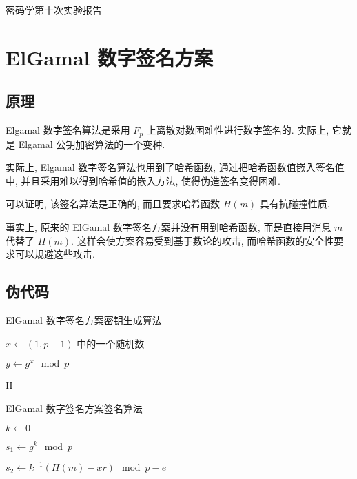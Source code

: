 \documentclass[12pt,a4paper]{article}
\begin{document}
{
\begin{center}
密码学第十次实验报告
\end{center}
}

\section*{ElGamal 数字签名方案}

\subsection*{原理}

Elgamal 数字签名算法是采用 $ F_p $ 上离散对数困难性进行数字签名的. 实际上, 它就是 Elgamal 公钥加密算法的一个变种. 

实际上, Elgamal 数字签名算法也用到了哈希函数, 通过把哈希函数值嵌入签名值中, 并且采用难以得到哈希值的嵌入方法, 使得伪造签名变得困难. 

可以证明, 该签名算法是正确的, 而且要求哈希函数 $ H(m) $ 具有抗碰撞性质.  

事实上, 原来的 ElGamal 数字签名方案并没有用到哈希函数, 而是直接用消息 $ m $ 代替了 $ H(m) $. 这样会使方案容易受到基于数论的攻击, 而哈希函数的安全性要求可以规避这些攻击. 

\subsection*{伪代码}

\begin{algorithm}[H]
\caption{ElGamal 数字签名方案密钥生成算法}

$ x \leftarrow (1, p - 1) $ 中的一个随机数

$ y \leftarrow g^x \mod p $

\end{algorithm}

\begin{algorithm}{H}
\caption{ElGamal 数字签名方案签名算法}

$ k \leftarrow 0 $


$ s_1 \leftarrow g^k \mod p $

$ s_2 \leftarrow k^{-1} (H(m) - x r) \mod p - e $

\end{algorithm}
\end{document}
